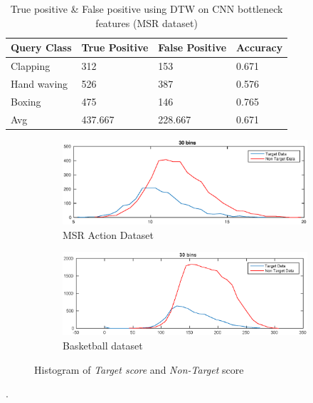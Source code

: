 \begin{table}[ht]
\caption[Event classification using DTW on CNN bottleneck features (MSR Action dataset \RN{2}) ]{True positive \& False positive using DTW on CNN bottleneck features (MSR dataset)}
\label{table:cnn_dtw_res_msr}
\centering
\begin{tabular}{|l|l|l|l|}
\hline
Query Class & True Positive & False Positive & Accuracy \\ \hline
Clapping    &312	&153	&0.671\\
Hand waving &526	&387	&0.576\\
Boxing      &475	&146	&0.765\\
\hline
Avg	&437.667	&228.667	&0.671\\
\hline  
\end{tabular}
\end{table} 
\pagebreak
\begin{figure}[ht]
        \centering
        \begin{subfigure}[b]{0.9\textwidth}
        		\centering
        		\includegraphics[width=\textwidth]{./imgs/MSR_DTW.eps}
        		\caption{MSR Action Dataset}
        \end{subfigure}
        
        \begin{subfigure}[b]{0.9\textwidth}
        			\centering
                \includegraphics[width=\textwidth]{./imgs/Basket_DTW.eps}
                \caption{Basketball dataset}
        \end{subfigure}
        \caption{Histogram of \textit{Target score} and \textit{Non-Target} score}
        \label{fig:dtw_score}
\end{figure}.

